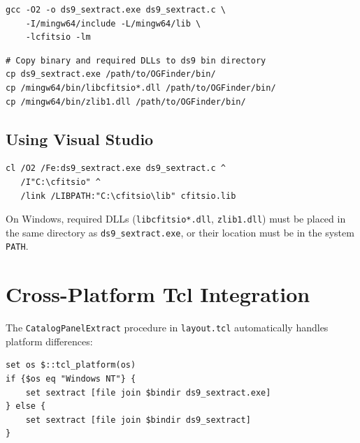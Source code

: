 \documentclass[11pt,fleqn]{book}
\begin{document}
\begin{codebox}[Compile]
\begin{lstlisting}[style=bash,numbers=none]
gcc -O2 -o ds9_sextract.exe ds9_sextract.c \
    -I/mingw64/include -L/mingw64/lib \
    -lcfitsio -lm
\end{lstlisting}
\end{codebox}

\begin{codebox}[Deploy]
\begin{lstlisting}[style=bash,numbers=none]
# Copy binary and required DLLs to ds9 bin directory
cp ds9_sextract.exe /path/to/OGFinder/bin/
cp /mingw64/bin/libcfitsio*.dll /path/to/OGFinder/bin/
cp /mingw64/bin/zlib1.dll /path/to/OGFinder/bin/
\end{lstlisting}
\end{codebox}

\subsection{Using Visual Studio}

\begin{codebox}
\begin{lstlisting}[style=bash,numbers=none]
cl /O2 /Fe:ds9_sextract.exe ds9_sextract.c ^
   /I"C:\cfitsio" ^
   /link /LIBPATH:"C:\cfitsio\lib" cfitsio.lib
\end{lstlisting}
\end{codebox}

\begin{important}
On Windows, required DLLs (\texttt{libcfitsio*.dll}, \texttt{zlib1.dll}) must be placed in the same directory as \texttt{ds9\_sextract.exe}, or their location must be in the system \texttt{PATH}.
\end{important}


\section{Cross-Platform Tcl Integration}

The \texttt{CatalogPanelExtract} procedure in \texttt{layout.tcl} automatically handles platform differences:

\begin{codebox}
\begin{lstlisting}[style=tcl,numbers=none]
set os $::tcl_platform(os)
if {$os eq "Windows NT"} {
    set sextract [file join $bindir ds9_sextract.exe]
} else {
    set sextract [file join $bindir ds9_sextract]
}
\end{lstlisting}
\end{codebox}
\end{document}
